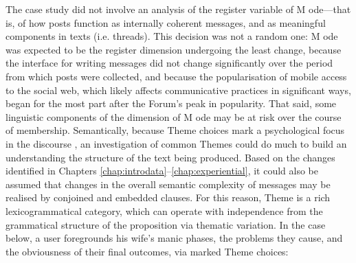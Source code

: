 The case study did not involve an analysis of the register variable of M ode---that is, of how \glspl{post} function as internally coherent messages, and as meaningful components in texts (i.e. \glspl{thread}). This decision was not a random one: M ode was expected to be the register dimension undergoing the least change, because the interface for writing messages did not change significantly over the period from which \glspl{post} were collected, and because the popularisation of mobile access to the social web, which likely affects communicative practices in significant ways, began for the most part after the \gls{Forum}'s peak in popularity. That said, some linguistic components of the dimension of M ode may be at risk over the course of membership. Semantically, because Theme choices mark a psychological focus in the discourse \cite{halliday_introduction_2004}, an investigation of common Themes could do much to build an understanding the structure of the text being produced. Based on the changes identified in Chapters \ref{chap:introdata}--\ref{chap:experiential}, it could also be assumed that changes in the overall semantic complexity of messages may be realised by conjoined and embedded clauses. For this reason, \gls{Theme} is a rich lexicogrammatical category, which can operate with independence from the grammatical structure of the proposition via thematic variation. In the case below, a user foregrounds his wife's manic phases, the problems they cause, and the obviousness of their final outcomes, via marked \gls{Theme} choices:

